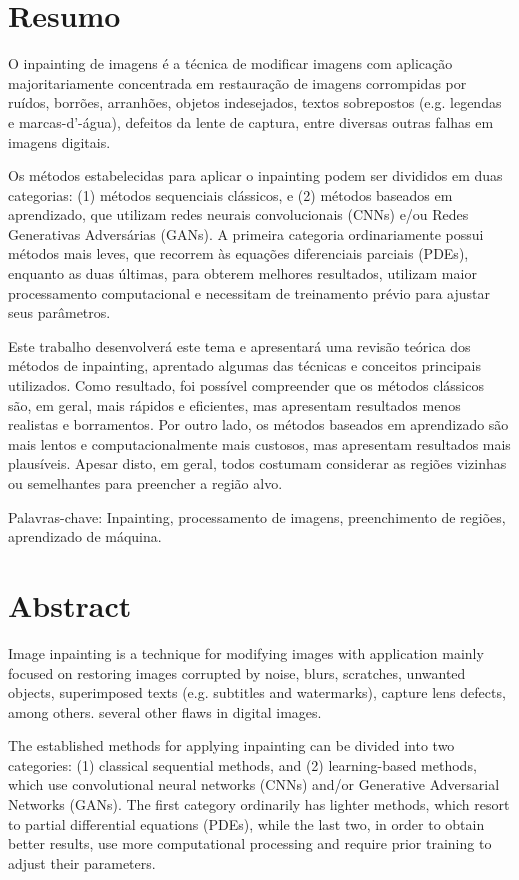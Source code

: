 \section*{Resumo}
O inpainting de imagens é a técnica de modificar imagens com aplicação majoritariamente concentrada em restauração de imagens corrompidas por ruídos, borrões, arranhões, objetos indesejados, textos sobrepostos (e.g. legendas e marcas-d’-água), defeitos da lente de captura, entre diversas outras falhas em imagens digitais. 

Os métodos estabelecidas para aplicar o inpainting podem ser divididos em duas categorias: (1) métodos sequenciais clássicos, e (2) métodos baseados em aprendizado, que utilizam redes neurais convolucionais (CNNs) e/ou Redes Generativas Adversárias (GANs). A primeira categoria ordinariamente possui métodos mais leves, que recorrem às equações diferenciais parciais (PDEs), enquanto as duas últimas, para obterem melhores resultados, utilizam maior processamento computacional e necessitam de treinamento prévio para ajustar seus parâmetros.

Este trabalho desenvolverá este tema e apresentará uma revisão teórica dos métodos de inpainting, aprentado algumas das técnicas e conceitos principais utilizados. Como resultado, foi possível compreender que os métodos clássicos são, em geral, mais rápidos e eficientes, mas apresentam resultados menos realistas e borramentos. Por outro lado, os métodos baseados em aprendizado são mais lentos e computacionalmente mais custosos, mas apresentam resultados mais plausíveis. Apesar disto, em geral, todos costumam considerar as regiões vizinhas ou semelhantes para preencher a região alvo.

Palavras-chave: Inpainting, processamento de imagens, preenchimento de regiões, aprendizado de máquina.
\pagebreak
\section*{Abstract}
Image inpainting is a technique for modifying images with application mainly focused on restoring images corrupted by noise, blurs, scratches, unwanted objects, superimposed texts (e.g. subtitles and watermarks), capture lens defects, among others. several other flaws in digital images.

The established methods for applying inpainting can be divided into two categories: (1) classical sequential methods, and (2) learning-based methods, which use convolutional neural networks (CNNs) and/or Generative Adversarial Networks (GANs). The first category ordinarily has lighter methods, which resort to partial differential equations (PDEs), while the last two, in order to obtain better results, use more computational processing and require prior training to adjust their parameters.

